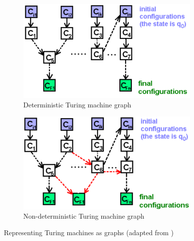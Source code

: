 \documentclass{article}
\begin{document}
\begin{figure}[H]
    \centering
    \captionsetup{justification=centering, size=scriptsize}
    \begin{subfigure}{0.47\textwidth}
        \includegraphics[width=1\textwidth, keepaspectratio]{deterministic_turing_machine_graph.png}
        \caption{Deterministic Turing machine graph}
    \end{subfigure}
    \quad
    \begin{subfigure}{0.47\textwidth}
        \includegraphics[width=1\textwidth, keepaspectratio]{non-deterministic_turing_machine_graph.png}
        \caption{Non-deterministic Turing machine graph}
    \end{subfigure}
    \caption{Representing Turing machines as graphs (adapted from \cite{laud_complexity_2011})}
    \label{fig:turing-machines-as-graphs}
\end{figure}
\end{document}
